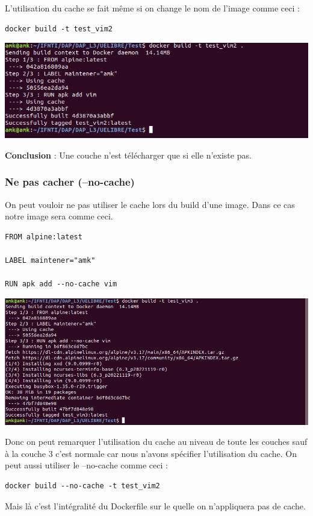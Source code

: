 \documentclass[12pt,a4paper]{article}
\begin{document}
L'utilisation du cache se fait même si on change le nom de l'image comme ceci :
\begin{verbatim}
docker build -t test_vim2
\end{verbatim}
\begin{center}
\includegraphics[scale=0.3]{img/test_vim3.png}
\end{center}
\textbf{Conclusion } : Une couche n'est télécharger que si elle n'existe pas.
\subsubsection{Ne pas cacher (--no-cache)}
On peut vouloir ne pas utiliser le cache lors du build d'une image. Dans ce cas notre image
sera comme ceci.
\begin{verbatim}
FROM alpine:latest

LABEL maintener="amk"

RUN apk add --no-cache vim
\end{verbatim}
\begin{center}
\includegraphics[scale=0.3]{img/test_vim_no_cache.png}
\end{center}
Donc on peut remarquer l'utilisation du cache au niveau de toute les couches sauf à la 
couche 3 c'est normale car nous n'avons spécifier l'utilisation du cache.
On peut aussi utiliser le --no-cache comme ceci :
\begin{verbatim}
docker build --no-cache -t test_vim2
\end{verbatim}
Mais là c'est l'intégralité du Dockerfile sur le quelle on n'appliquera pas de cache.
\end{document}
